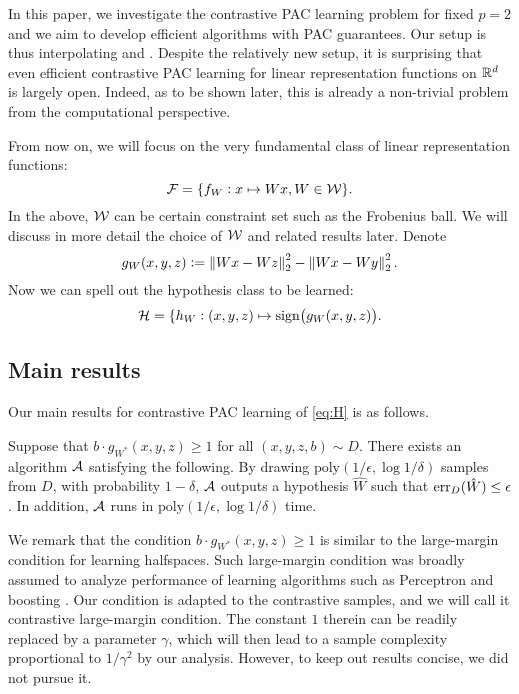 In this paper, we investigate the contrastive PAC learning problem for fixed $p = 2$ and we aim to develop efficient algorithms with PAC guarantees. Our setup is thus interpolating \citet{arora2019contrastive} and \citet{alon2024contrastive}. Despite the relatively new setup, it is surprising that even efficient contrastive PAC learning for linear representation functions on $\mathbb{R}^d$ is largely open. Indeed, as to be shown later, this is already a non-trivial problem from the computational perspective.

From now on, we will focus on the very fundamental class of linear representation functions:
\begin{equation}\label{eq:F}
\mathcal{F} = \{f_W: x \mapsto W x, W \in \mathcal{W}\}.
\end{equation}
In the above, $\mathcal{W}$ can be certain constraint set such as the Frobenius ball. We will discuss in more detail the choice of $\mathcal{W}$ and related results later. Denote
\begin{equation}\label{eq:g}
g_W(x, y, z) := \left\lVert Wx - Wz \right\rVert_{2}^2 - \left\lVert Wx - Wy \right\rVert_{2}^2.
\end{equation}
 Now we can spell out the hypothesis class to be learned:
\begin{equation}\label{eq:H}
\mathcal{H} = \{ h_W: (x, y, z) \mapsto \mathrm{sign}\big( g_W(x, y, z) \big).
\end{equation}

\subsection{Main results}

Our main results for contrastive PAC learning of \eqref{eq:H} is as follows.

\begin{theorem}\label{thm:main-informal}
Suppose that $b \cdot g_{W^*}(x, y, z) \geq 1$ for all $(x, y, z, b) \sim D$. There exists an algorithm $\mathcal{A}$ satisfying the following. By drawing $\mathrm{poly}(1/\epsilon, \log1/\delta)$ samples from $D$, with probability $1-\delta$, $\mathcal{A}$ outputs a hypothesis $\hat{W}$ such that $\mathrm{err}_D(\hat{W}) \leq \epsilon$. In addition, $\mathcal{A}$ runs in $\mathrm{poly}(1/\epsilon, \log1/\delta)$ time.
\end{theorem}

We remark that the condition $b \cdot g_{W^*}(x, y, z) \geq 1$ is similar to the large-margin condition for learning halfspaces. Such large-margin condition was broadly assumed to analyze performance of learning algorithms such as Perceptron \citep{rosenblatt1958perceptron} and boosting \citep{schapire2012boosting}. Our condition is adapted to the contrastive samples, and we will call it contrastive large-margin condition. The constant $1$ therein can be readily replaced by a parameter $\gamma$, which will then lead to a sample complexity proportional to $1/\gamma^2$ by our analysis. However, to keep out results concise, we did not pursue it.

